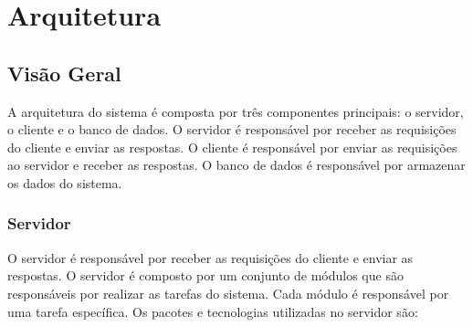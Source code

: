\chapter[Arquitetura]{Arquitetura}

\section{Visão Geral}

A arquitetura do sistema é composta por três componentes principais: o servidor, o cliente e o banco de dados. O servidor é responsável por receber as requisições do cliente e enviar as respostas. O cliente é responsável por enviar as requisições ao servidor e receber as respostas. O banco de dados é responsável por armazenar os dados do sistema.

\subsection{Servidor}

O servidor é responsável por receber as requisições do cliente e enviar as respostas. O servidor é composto por um conjunto de módulos que são responsáveis por realizar as tarefas do sistema. Cada módulo é responsável por uma tarefa específica. Os pacotes e tecnologias utilizadas no servidor são:

